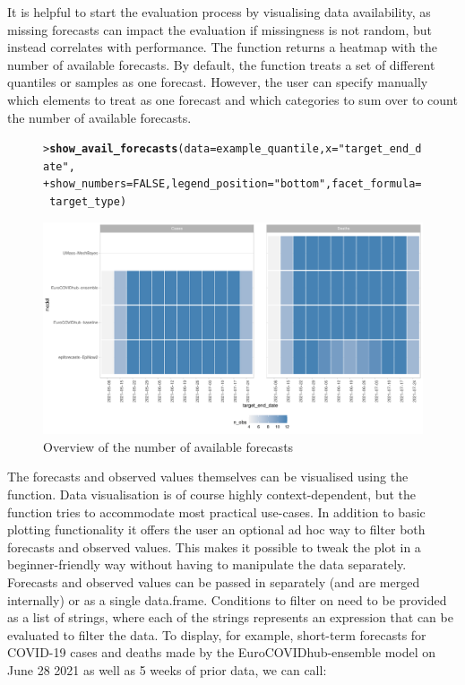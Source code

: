 \documentclass[article,shortnames]{jss}\usepackage[]{graphicx}\usepackage[]{color}
\makeatletter
\def\maxwidth{ %
  \ifdim\Gin@nat@width>\linewidth
    \linewidth
  \else
    \Gin@nat@width
  \fi
}
\newcommand{\hlnum}[1]{\textcolor[rgb]{0.686,0.059,0.569}{#1}}%
\newcommand{\hlstr}[1]{\textcolor[rgb]{0.192,0.494,0.8}{#1}}%
\newcommand{\hlopt}[1]{\textcolor[rgb]{0,0,0}{#1}}%
\newcommand{\hlstd}[1]{\textcolor[rgb]{0.345,0.345,0.345}{#1}}%
\newcommand{\hlkwc}[1]{\textcolor[rgb]{0.333,0.667,0.333}{#1}}%
\newcommand{\hlkwd}[1]{\textcolor[rgb]{0.737,0.353,0.396}{\textbf{#1}}}%
\newenvironment{kframe}{%
 \def\at@end@of@kframe{}%
 \ifinner\ifhmode%
  \def\at@end@of@kframe{\end{minipage}}%
  \begin{minipage}{\columnwidth}%
 \fi\fi%
 \def\FrameCommand##1{\hskip\@totalleftmargin \hskip-\fboxsep
 \colorbox{shadecolor}{##1}\hskip-\fboxsep
     \hskip-\linewidth \hskip-\@totalleftmargin \hskip\columnwidth}%
 \MakeFramed {\advance\hsize-\width
   \@totalleftmargin\z@ \linewidth\hsize
   \@setminipage}}%
 {\par\unskip\endMakeFramed%
 \at@end@of@kframe}
\newenvironment{knitrout}{}{} %
\newcommand{\fct}[1]{\code{#1()}}
\makeatother
\begin{document}
It is helpful to start the evaluation process by visualising data availability, as missing forecasts can impact the evaluation if missingness is not random, but instead correlates with performance. The function \fct{show\_avail\_forecasts} returns a heatmap with the number of available forecasts. By default, the function treats a set of different quantiles or samples as one forecast. However, the user can specify manually which elements to treat as one forecast and which categories to sum over to count the number of available forecasts. 
% 
\begin{figure}[h]
\centering
\begin{knitrout}
\color{fgcolor}\begin{kframe}
\begin{alltt}
\hlstd{> }\hlkwd{show_avail_forecasts}\hlstd{(}\hlkwc{data} \hlstd{= example_quantile,} \hlkwc{x} \hlstd{=} \hlstr{"target_end_date"}\hlstd{,}
\hlstd{+ }    \hlkwc{show_numbers} \hlstd{=} \hlnum{FALSE}\hlstd{,} \hlkwc{legend_position} \hlstd{=} \hlstr{"bottom"}\hlstd{,} \hlkwc{facet_formula} \hlstd{=} \hlopt{~}\hlstd{target_type)}
\end{alltt}
\end{kframe}
\includegraphics[width=\maxwidth]{plots/plot-show-availability-1} 
\end{knitrout}
\caption{\label{fig:avail-forecasts} Overview of the number of available forecasts}
\end{figure}
% 
The forecasts and observed values themselves can be visualised using the \fct{plot\_predictions} function. Data visualisation is of course highly context-dependent, but the function tries to accommodate most practical use-cases. In addition to basic plotting functionality it offers the user an optional ad hoc way to filter both forecasts and observed values. This makes it possible to tweak the plot in a beginner-friendly way without having to manipulate the data separately. Forecasts and observed values can be passed in separately (and are merged internally) or as a single data.frame. Conditions to filter on need to be provided as a list of strings, where each of the strings represents an expression that can be evaluated to filter the data. To display, for example, short-term forecasts for COVID-19 cases and deaths made by the EuroCOVIDhub-ensemble model on June 28 2021 as well as 5 weeks of prior data, we can call: %
\end{document}
